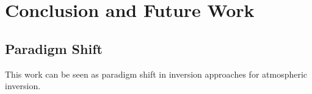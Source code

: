 
\chapter{Conclusion and Future Work}\label{chapter:conclusion}

\section{Paradigm Shift}
This work can be seen as paradigm shift in inversion approaches for atmospheric inversion.
